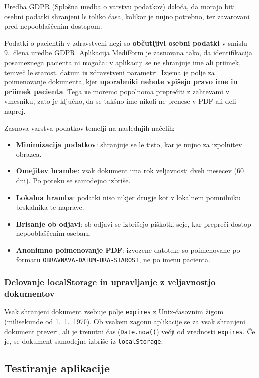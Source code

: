 \documentclass[12pt,a4paper]{article}
\begin{document}
Uredba GDPR (Splo\v{s}na uredba o varstvu podatkov) dolo\v{c}a, da morajo biti osebni podatki shranjeni le toliko \v{c}asa, kolikor je nujno potrebno, ter zavarovani pred nepoobla\v{s}\v{c}enim dostopom.

Podatki o pacientih v zdravstveni negi so \textbf{ob\v{c}utljivi osebni podatki} v smislu 9.~\v{c}lena uredbe GDPR. Aplikacija MediForm je zasnovana tako, da identifikacija posameznega pacienta ni mogo\v{c}a: v aplikaciji se ne shranjuje ime ali priimek, temve\v{c} le starost, datum in zdravstveni parametri. Izjema je polje za poimenovanje dokumenta, kjer \textbf{uporabniki nehote vpi\v{s}ejo pravo ime in priimek pacienta}. Tega ne moremo popolnoma prepre\v{c}iti z zahtevami v vmesniku, zato je klju\v{c}no, da se tak\v{s}no ime nikoli ne prenese v PDF ali deli naprej.

Zasnova varstva podatkov temelji na naslednjih na\v{c}elih:
\begin{itemize}
    \item \textbf{Minimizacija podatkov}: shranjuje se le tisto, kar je nujno za izpolnitev obrazca.
    \item \textbf{Omejitev hrambe}: vsak dokument ima rok veljavnosti dveh mesecev (60 dni). Po poteku se samodejno izbri\v{s}e.
    \item \textbf{Lokalna hramba}: podatki niso nikjer drugje kot v lokalnem pomnilniku brskalnika te naprave.
    \item \textbf{Brisanje ob odjavi}: ob odjavi se izbri\v{s}ejo pi\v{s}kotki seje, kar prepre\v{c}i dostop nepoobla\v{s}\v{c}enim osebam.
    \item \textbf{Anonimno poimenovanje PDF}: izvozene datoteke so poimenovane po formatu \texttt{OBRAVNAVA-DATUM-URA-STAROST}, ne po imenu pacienta.
\end{itemize}

\subsubsection{Delovanje localStorage in upravljanje z veljavnostjo dokumentov}

Vsak shranjeni dokument vsebuje polje \texttt{expires} z Unix-\v{c}asovnim \v{z}igom (milisekunde od 1.~1.~1970). Ob vsakem zagonu aplikacije se za vsak shranjeni dokument preveri, ali je trenutni \v{c}as (\texttt{Date.now()}) ve\v{c}ji od vrednosti \texttt{expires}. \v{C}e je, se dokument samodejno izbri\v{s}e iz \texttt{localStorage}.

\subsection{Testiranje aplikacije}
\end{document}
